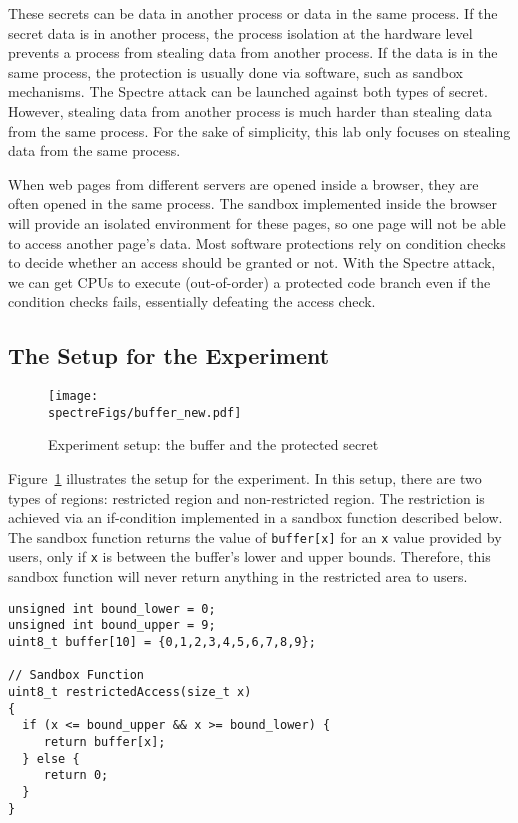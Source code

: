 These secrets can be data in another process or data in the same process. 
If the secret data is in another process, the process isolation at the hardware level prevents 
a process from stealing data from another process. If the data is in the same process, 
the protection is usually done via software, such as sandbox mechanisms.  
The Spectre attack can be launched against both types of secret. However, 
stealing data from another process is much harder than stealing data from the same process. For
the sake of simplicity, this lab only focuses on stealing data from the same process. 

When web pages from different servers are opened inside a browser, they are often opened in the
same process. The sandbox implemented inside the browser will provide an isolated environment
for these pages, so one page will not be able to access another page's data. 
Most software protections rely on condition checks to decide whether an access should be
granted or not. With the Spectre attack, we can get CPUs to execute (out-of-order) 
a protected code branch even if the condition checks fails, essentially defeating
the access check.


\subsection{The Setup for the Experiment} 


\begin{figure}[htb]
\centering
\texttt{[image: \\spectreFigs/buffer\_new.pdf]}
\caption{Experiment setup: the buffer and the protected secret}
\label{spectre:fig:buffer}
\end{figure}

Figure~\ref{spectre:fig:buffer} illustrates the setup for the experiment.
In this setup, there are two types of regions: restricted region and non-restricted region.
The restriction is achieved via an if-condition implemented in a sandbox function
described below. The sandbox function returns the value of \texttt{buffer[x]} for an \texttt{x}
value provided by users, only if \texttt{x} is between the buffer's
lower and upper bounds.
Therefore, this sandbox function
will never return anything in the restricted area to users.


\begin{lstlisting}
unsigned int bound_lower = 0;
unsigned int bound_upper = 9;
uint8_t buffer[10] = {0,1,2,3,4,5,6,7,8,9};

// Sandbox Function
uint8_t restrictedAccess(size_t x)
{
  if (x <= bound_upper && x >= bound_lower) {
     return buffer[x];
  } else {
     return 0;
  }
}
\end{lstlisting}

